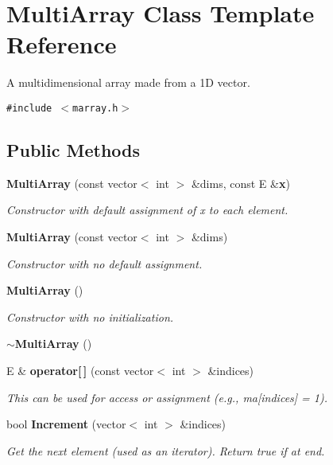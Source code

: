 \section{Multi\-Array  Class Template Reference}
\label{classMultiArray}
A multidimensional array made from a 1D vector. 


{\tt \#include $<$marray.h$>$}

\subsection*{Public Methods}
\begin{CompactItemize}
\item 
{\bf Multi\-Array} (const vector$<$ int $>$ \&dims, const E \&{\bf x})
\begin{CompactList}\small\item\em Constructor with default assignment of x to each element.\item\end{CompactList}\item 
{\bf Multi\-Array} (const vector$<$ int $>$ \&dims)
\begin{CompactList}\small\item\em Constructor with no default assignment.\item\end{CompactList}\item 
{\bf Multi\-Array} ()
\begin{CompactList}\small\item\em Constructor with no initialization.\item\end{CompactList}\item 
{\bf $\sim$Multi\-Array} ()
\item 
E \& {\bf operator[$\,$]} (const vector$<$ int $>$ \&indices)
\begin{CompactList}\small\item\em This can be used for access or assignment (e.g., ma[indices] = 1).\item\end{CompactList}\item 
bool {\bf Increment} (vector$<$ int $>$ \&indices)
\begin{CompactList}\small\item\em Get the next element (used as an iterator). Return true if at end.\item\end{CompactList}\end{CompactItemize}

